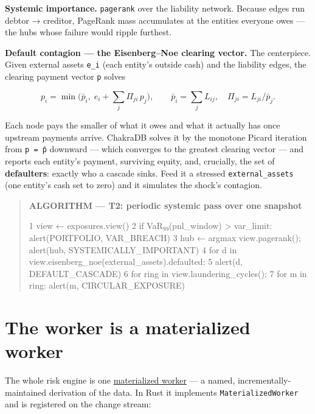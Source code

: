 \documentclass[
  11pt,
  openany]{book}
\newenvironment{Shaded}{}{}
\newcommand{\NormalTok}[1]{#1}
\begin{document}
\textbf{Systemic importance.} \texttt{pagerank} over the liability
network. Because edges run debtor → creditor, PageRank mass accumulates
at the entities everyone owes --- the hubs whose failure would ripple
furthest.

\textbf{Default contagion --- the Eisenberg--Noe clearing vector.} The
centerpiece. Given external assets \texttt{e\_i} (each entity's outside
cash) and the liability edges, the clearing payment vector \texttt{p}
solves

\[
  p_i = \min\!\Big( \bar p_i,\; e_i + \sum_j \Pi_{ji}\, p_j \Big),
  \qquad \bar p_i = \sum_j L_{ij},\quad \Pi_{ji} = L_{ji}/\bar p_j .
\]

Each node pays the smaller of what it owes and what it actually has once
upstream payments arrive. ChakraDB solves it by the monotone Picard
iteration from \texttt{p\ =\ p̄} downward --- which converges to the
greatest clearing vector --- and reports each entity's payment,
surviving equity, and, crucially, the set of \textbf{defaulters}:
exactly who a cascade sinks. Feed it a stressed
\texttt{external\_assets} (one entity's cash set to zero) and it
simulates the shock's contagion.

\begin{quote}
\textbf{ALGORITHM --- T2: periodic systemic pass over one snapshot}

\begin{Shaded}
\begin{Highlighting}[]
\NormalTok{1  view ← exposures.view()}
\NormalTok{2  if VaR₉₉(pnl\_window) \textgreater{} var\_limit:  alert(PORTFOLIO, VAR\_BREACH)}
\NormalTok{3  hub ← argmax view.pagerank();       alert(hub, SYSTEMICALLY\_IMPORTANT)}
\NormalTok{4  for d in view.eisenberg\_noe(external\_assets).defaulted:}
\NormalTok{5      alert(d, DEFAULT\_CASCADE)}
\NormalTok{6  for ring in view.laundering\_cycles():}
\NormalTok{7      for m in ring: alert(m, CIRCULAR\_EXPOSURE)}
\end{Highlighting}
\end{Shaded}
\end{quote}

\section{The worker is a materialized
worker}\label{the-worker-is-a-materialized-worker}

The whole risk engine is one \href{../engine/overview.md}{materialized
worker} --- a named, incrementally-maintained derivation of the data. In
Rust it implements \texttt{MaterializedWorker} and is registered on the
change stream:
\end{document}
